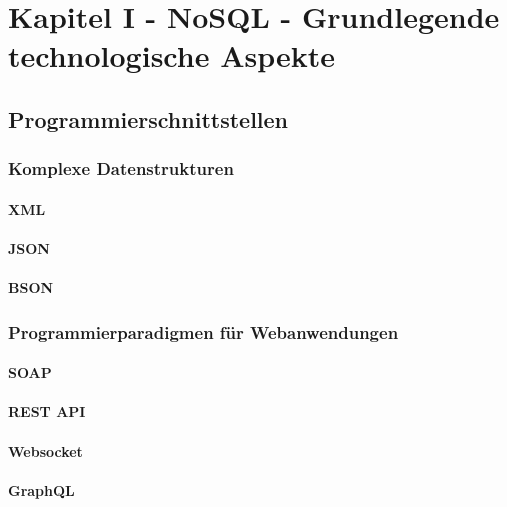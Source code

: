 \chapter{Kapitel I - NoSQL - Grundlegende technologische Aspekte}
\setcounter{section}{7}
\section{Programmierschnittstellen}

\subsection{Komplexe Datenstrukturen}
\subsubsection{XML}
\subsubsection{JSON}
\subsubsection{BSON}

\subsection{Programmierparadigmen für Webanwendungen}
\subsubsection{SOAP}
\subsubsection{REST API}
\subsubsection{Websocket}
\subsubsection{GraphQL}

